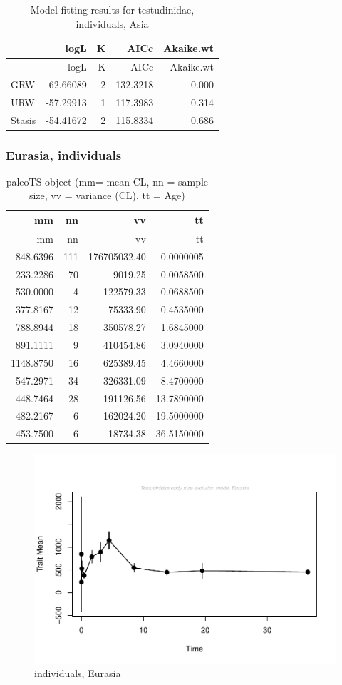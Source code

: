 \documentclass[]{article}
\begin{document}
\begin{longtable}[]{@{}lrrrr@{}}
\caption{Model-fitting results for testudinidae, individuals,
Asia}\tabularnewline
\toprule
& logL & K & AICc & Akaike.wt\tabularnewline
\midrule
\endfirsthead
\toprule
& logL & K & AICc & Akaike.wt\tabularnewline
\midrule
\endhead
GRW & -62.66089 & 2 & 132.3218 & 0.000\tabularnewline
URW & -57.29913 & 1 & 117.3983 & 0.314\tabularnewline
Stasis & -54.41672 & 2 & 115.8334 & 0.686\tabularnewline
\bottomrule
\end{longtable}

\newpage

\subsubsection{Eurasia, individuals}\label{eurasia-individuals}

\begin{longtable}[]{@{}rrrr@{}}
\caption{paleoTS object (mm= mean CL, nn = sample size, vv = variance
(CL), tt = Age)}\tabularnewline
\toprule
mm & nn & vv & tt\tabularnewline
\midrule
\endfirsthead
\toprule
mm & nn & vv & tt\tabularnewline
\midrule
\endhead
848.6396 & 111 & 176705032.40 & 0.0000005\tabularnewline
233.2286 & 70 & 9019.25 & 0.0058500\tabularnewline
530.0000 & 4 & 122579.33 & 0.0688500\tabularnewline
377.8167 & 12 & 75333.90 & 0.4535000\tabularnewline
788.8944 & 18 & 350578.27 & 1.6845000\tabularnewline
891.1111 & 9 & 410454.86 & 3.0940000\tabularnewline
1148.8750 & 16 & 625389.45 & 4.4660000\tabularnewline
547.2971 & 34 & 326331.09 & 8.4700000\tabularnewline
448.7464 & 28 & 191126.56 & 13.7890000\tabularnewline
482.2167 & 6 & 162024.20 & 19.5000000\tabularnewline
453.7500 & 6 & 18734.38 & 36.5150000\tabularnewline
\bottomrule
\end{longtable}

\begin{figure}[htbp]
\centering
\includegraphics{MA_JJ_files/figure-latex/paleoTS, individuals, Eurasia-1.pdf}
\caption{individuals, Eurasia}
\end{figure}
\end{document}
